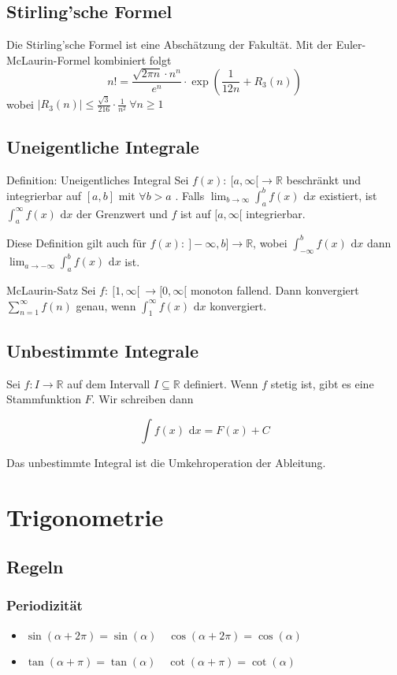 \documentclass[a4paper,10pt]{article}
\def\R{\mathbb{R}}
\def\dx{\text{ d}x}
\begin{document}
\subsection{Stirling'sche Formel}
Die Stirling'sche Formel ist eine Abschätzung der Fakultät. Mit der Euler-McLaurin-Formel kombiniert folgt
$$n! = \frac{\sqrt{2\pi n} \cdot n^n}{e^n} \cdot \exp(\frac{1}{12n}+R_3(n))$$
wobei $|R_3(n)| \le \frac{\sqrt{3}}{216}\cdot\frac{1}{n^2} \ \forall n \ge 1$

\subsection{Uneigentliche Integrale}
\begin{subbox}{Definition: Uneigentliches Integral}
 Sei $f(x): \ [ a,\infty [ \to \R$ beschränkt und integrierbar auf $[a,b] $ mit $\forall b > a$ . Falls $\lim_{b\to\infty} \int_a^b f(x) \dx$ existiert, ist $\int_a^\infty f(x) \dx$ der Grenzwert und $f$ ist auf $[a, \infty[$ integrierbar.
\end{subbox}
Diese Definition gilt auch für $f(x) : \ ]-\infty,b] \to \R$, wobei $\int_{-\infty}^b f(x) \dx $ dann $ \lim_{a\to-\infty} \int_a^b f(x) \dx$ ist.
\begin{subbox}{McLaurin-Satz}
Sei $f: \ [1, \infty[ \ \to [0, \infty[$ monoton fallend. Dann konvergiert $\sum_{n=1}^\infty f(n)$ genau, wenn $\int_1^\infty f(x) \dx$ konvergiert.
\end{subbox}

\subsection{Unbestimmte Integrale}
Sei $f: I \to \R$ auf dem Intervall $I \subseteq \R$ definiert. Wenn $f$ stetig ist, gibt es eine Stammfunktion $F$. Wir schreiben dann

$$\int f(x) \dx = F(x) + C$$

Das unbestimmte Integral ist die Umkehroperation der Ableitung.

\section{Trigonometrie}

\subsection{Regeln}
\subsubsection{Periodizität}
\begin{itemize}
 \item $\sin(\alpha + 2 \pi) = \sin(\alpha) \quad \cos(\alpha + 2 \pi) = \cos(\alpha)$
 \item $\tan(\alpha + \pi) = \tan(\alpha) \quad \cot(\alpha + \pi) = \cot(\alpha)$
\end{itemize}
\end{document}
